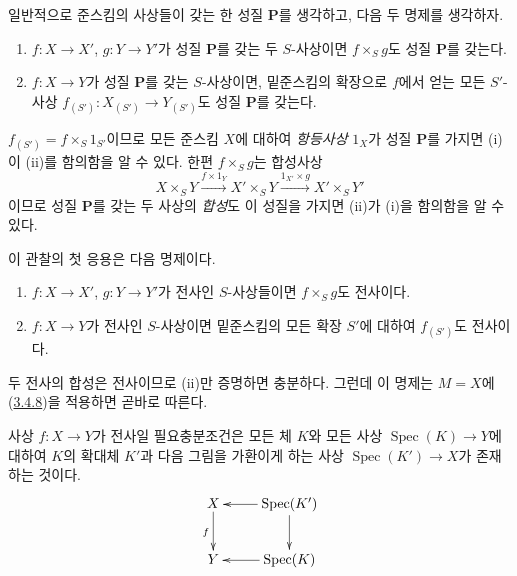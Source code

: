 \begin{env}[3.5.1]
\label{I.3.5.1-ko}
일반적으로 준스킴의 사상들이 갖는 한 성질 $\mathbf{P}$를 생각하고,
다음 두 명제를 생각하자.
\begin{enumerate}
  \item[(i)] $f:X\to X'$, $g:Y\to Y'$가 성질 $\mathbf{P}$를 갖는 두
  $S$-사상이면 $f\times_S g$도 성질 $\mathbf{P}$를 갖는다.
  \item[(ii)] $f:X\to Y$가 성질 $\mathbf{P}$를 갖는 $S$-사상이면,
  밑준스킴의 확장으로 $f$에서 얻는 모든 $S'$-사상
  $f_{(S')}:X_{(S')}\to Y_{(S')}$도 성질 $\mathbf{P}$를 갖는다.
\end{enumerate}

$f_{(S')}=f\times_S 1_{S'}$이므로 모든 준스킴 $X$에 대하여
\emph{항등사상} $1_X$가 성질 $\mathbf{P}$를 가지면 (i)이 (ii)를
함의함을 알 수 있다. 한편 $f\times_S g$는 합성사상
\label{I.3.5.1.product-composition-ko}
\[
  X\times_S Y\xrightarrow{f\times 1_Y}X'\times_S Y
  \xrightarrow{1_{X'}\times g}X'\times_S Y'
\]
이므로 성질 $\mathbf{P}$를 갖는 두 사상의 \emph{합성}도 이 성질을
가지면 (ii)가 (i)을 함의함을 알 수 있다.
\end{env}

이 관찰의 첫 응용은 다음 명제이다.

\begin{proposition}[3.5.2]
\label{I.3.5.2-ko}
\begin{enumerate}
  \item[(i)] $f:X\to X'$, $g:Y\to Y'$가 전사인 $S$-사상들이면
  $f\times_S g$도 전사이다.
  \item[(ii)] $f:X\to Y$가 전사인 $S$-사상이면 밑준스킴의 모든 확장
  $S'$에 대하여 $f_{(S')}$도 전사이다.
\end{enumerate}
\end{proposition}

두 전사의 합성은 전사이므로 (ii)만 증명하면 충분하다. 그런데 이
명제는 $M=X$에 (\hyperref[I.3.4.8-ko]{3.4.8})을 적용하면 곧바로
따른다.

\begin{proposition}[3.5.3]
\label{I.3.5.3-ko}
사상 $f:X\to Y$가 전사일 필요충분조건은 모든 체 $K$와 모든 사상
$\operatorname{Spec}(K)\to Y$에 대하여 $K$의 확대체 $K'$과 다음
그림을 가환이게 하는 사상 $\operatorname{Spec}(K')\to X$가 존재하는
것이다.
\label{I.3.5.3.surjectivity-diagram-ko}
\[
  \xymatrix{
    X\ar[d]_f & \operatorname{Spec}(K')\ar[l]\ar[d]\\
    Y & \operatorname{Spec}(K)\ar[l]
  }
\]
\end{proposition}


